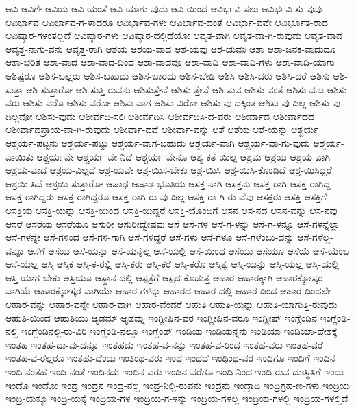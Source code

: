 {ಆವಿ
ಆವಿಗೇ
ಆವಿಯ
ಆವಿ-ಯಂತೆ
ಆವಿ-ಯಾಗು-ವುದು
ಆವಿ-ಯಿಂದ
ಆವಿರ್ಭವಿ-ಸಲು
ಆವಿರ್ಭವಿ-ಸು-ವುವು
ಆವಿರ್ಭಾವ
ಆವಿರ್ಭಾವ-ಗ-ಳಾದರೂ
ಆವಿರ್ಭಾವ-ಗಳು
ಆವಿರ್ಭಾವ-ದಂತೆ
ಆವಿರ್ಭಾ-ವವೇ
ಆವಿರ್ಭೂತ-ರಾದ
ಆವಿಷ್ಕಾರ-ಗಳಂತಲ್ಲದೆ
ಆವಿಷ್ಕಾರ-ಗಳು
ಆವಿಷ್ಕಾರ-ದಲ್ಲಿದೆಯೋ
ಆವೃತ-ವಾಗಿ
ಆವೃತ-ವಾ-ಗಿ-ರುವುದು
ಆವೃತ-ವಾದ
ಆವೃತ್ತ-ನಾಗು-ವನು
ಆವೃತ್ತ-ರಾಗಿ
ಆಶಯ
ಆಶಯ-ವಾದ
ಆಶ-ಯವು
ಆಶ-ಯವೂ
ಆಶಾ
ಆಶಾ-ಜನಕ-ವಾದುದೂ
ಆಶಾ-ಭರಿತ
ಆಶಾ-ವಾದ
ಆಶಾ-ವಾದ-ದಿಂದ
ಆಶಾ-ವಾದವೂ
ಆಶಾ-ವಾದಿ
ಆಶಾ-ವಾದಿ-ಗಳು
ಆಶಾ-ವಾದಿ-ಯಾಗು
ಆಶಿಷ್ಟರೂ
ಆಶಿಸ-ಬಲ್ಲರು
ಆಶಿಸ-ಬಹುದು
ಆಶಿಸ-ಬಾರದು
ಆಶಿಸ-ಬೇಡಿ
ಆಶಿಸಿ
ಆಶಿಸಿ-ದರು
ಆಶಿಸಿ-ದರೆ
ಆಶಿಸು
ಆಶಿ-ಸುತ್ತಾ
ಆಶಿ-ಸುತ್ತಾರೋ
ಆಶಿ-ಸುತ್ತಿ-ರುವನು
ಆಶಿಸುತ್ತೇನೆ
ಆಶಿಸು-ತ್ತೇವೆ
ಆಶಿ-ಸುವ
ಆಶಿಸು-ವಂತೆ
ಆಶಿಸು-ವನು
ಆಶಿಸು-ವರು
ಆಶಿಸು-ವರೊ
ಆಶಿಸು-ವರೋ
ಆಶಿಸು-ವಾಗ
ಆಶಿಸು-ವಿರೋ
ಆಶಿಸು-ವು-ದಕ್ಕಿಂತ
ಆಶಿಸು-ವು-ದಿಲ್ಲ
ಆಶಿಸು-ವು-ದಿಲ್ಲವೋ
ಆಶಿಸು-ವುದು
ಆಶೀರ್ವದಿ-ಸಲಿ
ಆಶೀರ್ವದಿಸಿ
ಆಶೀರ್ವದಿಸಿ-ದ-ವರು
ಆಶೀರ್ವಾದ
ಆಶೀರ್ವಾದದ
ಆಶೀರ್ವಾದಪ್ರಾಯ-ವಾ-ಗಿ-ರುವುದು
ಆಶೀರ್ವಾ-ದವೆ
ಆಶೀರ್ವಾ-ವನ್ನು
ಆಶೆ
ಆಶೆಯ
ಆಶೆ-ಯನ್ನು
ಆಶ್ಚರ್ಯ
ಆಶ್ಚರ್ಯ-ಪಟ್ಟನು
ಆಶ್ಚರ್ಯ-ಪಟ್ಟು
ಆಶ್ಚರ್ಯ-ವಾಗ-ಬಹುದು
ಆಶ್ಚರ್ಯ-ವಾಗಿ
ಆಶ್ಚರ್ಯ-ವಾ-ಗು-ವುದು
ಆಶ್ಚರ್ಯ-ವಾಯಿತು
ಆಶ್ಚರ್ಯವೇ
ಆಶ್ಚರ್ಯ-ವೇ-ನಿದೆ
ಆಶ್ಚರ್ಯ-ವೇನೂ
ಆಶ್ಯ-ಕತೆ-ಯಿಲ್ಲ
ಆಶ್ರಮ
ಆಶ್ರಯ
ಆಶ್ರಯ-ವಾಗಿ
ಆಶ್ರಯ-ವಾದ
ಆಶ್ರಯ-ವಿಲ್ಲದೆ
ಆಶ್ರ-ಯವೇ
ಆಶ್ರ-ಯಿಸ-ಬೇಕು
ಆಶ್ರ-ಯಿಸಿ
ಆಶ್ರ-ಯಿಸಿ-ಕೊಂಡಿದೆ
ಆಶ್ರ-ಯಿಸಿದ್ದರೆ
ಆಶ್ರಯಿ-ಸಿವೆ
ಆಶ್ರಯಿ-ಸುತ್ತಾರೋ
ಆಷಾಢ
ಆಷಾಢ-ಭೂತಿಯ
ಆಸಕ್ತ-ನಾಗಿ
ಆಸಕ್ತನು
ಆಸಕ್ತ-ರಾಗಿ
ಆಸಕ್ತ-ರಾಗಿದ್ದ
ಆಸಕ್ತ-ರಾಗಿದ್ದರು
ಆಸಕ್ತ-ರಾಗಿದ್ದರೂ
ಆಸಕ್ತ-ರಾಗಿ-ರು-ವು-ದಿಲ್ಲ
ಆಸಕ್ತ-ರಾ-ಗಿ-ರು-ವೆವು
ಆಸಕ್ತರು
ಆಸಕ್ತಿ
ಆಸಕ್ತಿಗೆ
ಆಸಕ್ತಿಯ
ಆಸಕ್ತಿ-ಯನ್ನು
ಆಸಕ್ತಿ-ಯಿಂದ
ಆಸಕ್ತಿ-ಯಿದ್ದರೆ
ಆಸಕ್ತಿ-ಯೊಂದಿಗೆ
ಆಸನ
ಆಸ-ನದ
ಆಸನ-ವನ್ನು
ಆಸ-ನವು
ಆಸರೆ
ಆಸರೆಯ
ಆಸರೆಯೂ
ಆಸುರೀ
ಆಸುರೀದ್ವೇಷವು
ಆಸೆ
ಆಸೆ-ಗಳ
ಆಸೆ-ಗ-ಳನ್ನು
ಆಸೆ-ಗ-ಳನ್ನೂ
ಆಸೆ-ಗಳನ್ನೆಲ್ಲಾ
ಆಸೆ-ಗಳನ್ನೇ
ಆಸೆ-ಗಳಿಂದ
ಆಸೆ-ಗಳಿ-ಗಾಗಿ
ಆಸೆ-ಗಳಿದ್ದರೆ
ಆಸೆ-ಗಳು
ಆಸೆ-ಗಳೂ
ಆಸೆ-ಗಳೆಂಬು-ದನ್ನು
ಆಸೆ-ಗಳೆಲ್ಲ-ವನ್ನೂ
ಆಸೆಗೆ
ಆಸೆಯ
ಆಸೆ-ಯನ್ನು
ಆಸೆ-ಯನ್ನೆಲ್ಲ
ಆಸೆ-ಯಲ್ಲಿ
ಆಸೆ-ಯಿಂದ
ಆಸೆಯು
ಆಸೆಯೂ
ಆಸೆಯೆ
ಆಸೆ-ಯೆಂಬ
ಆಸೆ-ಯೆಲ್ಲ
ಆಸ್ತಿ
ಆಸ್ತಿಕ
ಆಸ್ತಿ-ಕ-ರಲ್ಲಿ
ಆಸ್ತಿ-ಕರು
ಆಸ್ತಿ-ಕರೆ
ಆಸ್ತಿ-ಕರೊ
ಆಸ್ತಿತ್ವ
ಆಸ್ತಿ-ಯನ್ನು
ಆಸ್ತಿ-ಯಲ್ಲ
ಆಸ್ತಿ-ಯಲ್ಲಿ
ಆಸ್ತಿ-ಯಾಗ-ಬೇಕು
ಆಸ್ತಿಯೂ
ಆಸ್ಥಾನ-ದಲ್ಲಿ
ಆಸ್ಪತ್ರೆಗೆ
ಆಸ್ಪದ-ಕೊಡುತ್ತ
ಆಹಾರ
ಆಹಾರಕ್ಕಾಗಿ
ಆಹಾರಕ್ಕೋಸ್ಕರ-ವಾಗಿಯೆ
ಆಹಾರಕ್ಕೋಸ್ಕರ-ವಾಗಿಯೇ
ಆಹಾರ-ಗಳನ್ನು
ಆಹಾರದ
ಆಹಾರ-ದಲ್ಲಿ
ಆಹಾರ-ದಿಂದ
ಆಹಾರ-ದಿಂದಲೇ
ಆಹಾರ-ವನ್ನು
ಆಹಾರ-ವನ್ನೇ
ಆಹಾರ-ವಾಗಿ
ಆಹಾರ-ವೆಂದರೆ
ಆಹುತಿ
ಆಹುತಿ-ಯನ್ನು
ಆಹುತಿ-ಯಾಗುತ್ತಿ-ರುವುದು
ಆಹುತಿ-ಯಿಂದ
ಆಹುತಿಯು
ಆ್ಯಡಮ್
ಆ್ಯಡಮ್ನ
ಇಂಗ್ಲೀಷಿನ-ವರ
ಇಂಗ್ಲೀಷಿನ-ವರೂ
ಇಂಗ್ಲೀಷ್
ಇಂಗ್ಲೆಂಡಿನ
ಇಂಗ್ಲೆಂಡಿ-ನಲ್ಲಿ
ಇಂಗ್ಲೆಂಡಿನಲ್ಲಿ-ರು-ವಿರಿ
ಇಂಗ್ಲೆಂಡಿ-ನಲ್ಲೂ
ಇಂಗ್ಲೆಂಡ್
ಇಂಡಿಯ
ಇಂಡಿಯನ್ನನು
ಇಂಡಿಯಾ
ಇಂಡಿಯಾ-ದೇಶಕ್ಕೆ
ಇಂತಹ
ಇಂತಹ-ದಾ-ವು-ದನ್ನೂ
ಇಂತಹದು
ಇಂತಹ-ವ-ನನ್ನು
ಇಂತಹ-ವ-ರಿಂದ
ಇಂತಹ-ವರು
ಇಂತಹ-ವರೆ
ಇಂತಹ-ವ-ರೆಲ್ಲರೂ
ಇಂತಹು-ದೆಂದು
ಇಂತಿಂಥ-ವರು
ಇಂಥ
ಇಂಥದೆ
ಇಂಥಿಂಥ-ವರ
ಇಂದಿಗೂ
ಇಂದಿಗೆ
ಇಂದಿನ
ಇಂದಿ-ನಂತಹ
ಇಂದಿ-ನಂತೆ
ಇಂದಿನದು
ಇಂದಿನ-ವರು
ಇಂದಿನ-ವರೆಗೂ
ಇಂದಿ-ನಿಂದ
ಇಂದಿ-ರುವ-ದುಃಸ್ಥಿತಿಗೆ
ಇಂದು
ಇಂದೊ
ಇಂದೋ
ಇಂದ್ರ
ಇಂದ್ರನ
ಇಂದ್ರ-ನಲ್ಲ
ಇಂದ್ರ-ನಿಲ್ಲಿ-ರುವನು
ಇಂದ್ರನು
ಇಂದ್ರಾದಿ
ಇಂದ್ರಿಗ್ರಹ-ಣ-ಗಳು
ಇಂದ್ರಿಯ
ಇಂದ್ರಿ-ಯಕ್ಕೂ
ಇಂದ್ರಿ-ಯಕ್ಕೆ
ಇಂದ್ರಿಯ-ಗಳ
ಇಂದ್ರಿಯ-ಗ-ಳನ್ನು
ಇಂದ್ರಿಯ-ಗಳಲ್ಲ
ಇಂದ್ರಿಯ-ಗಳಲ್ಲಿ
ಇಂದ್ರಿಯ-ಗಳಲ್ಲಿದೆ
}
